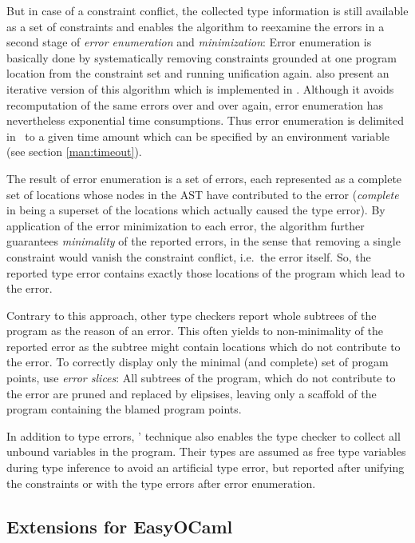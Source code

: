 But in case of a constraint conflict, the collected type information is still
available as a set of constraints and enables the algorithm to reexamine the
errors in a second stage of \emph{error enumeration} and \emph{minimization}:
Error enumeration is basically done by systematically removing constraints
grounded at one program location from the constraint set and running unification
again.
\citet{haackwells04} also present an iterative version of this algorithm which
is implemented in \easyocaml. Although it avoids recomputation of the same
errors over and over again, error enumeration has nevertheless exponential time
consumptions. Thus error enumeration is delimited in \easyocaml\ to a given time
amount which can be specified by an environment variable (see section
\ref{man:timeout}).

The result of error enumeration is a set of errors, each represented as a
complete set of locations whose nodes in the AST have contributed to the error
(\emph{complete} in being a superset of the locations which actually caused the type
error). By application of the error minimization to each error, the algorithm
further guarantees \emph{minimality} of the reported errors, in the sense that
removing a single constraint would vanish the constraint conflict, i.e.\ the
error itself.  So, the reported type error contains exactly those locations of
the program which lead to the error.

Contrary to this approach, other type checkers report whole subtrees of the
program as the reason of an error. This often yields to non-minimality of the
reported error as the subtree might contain locations which do not contribute
to the error. To correctly display only the minimal (and complete) set of
progam points, \citeauthor{haackwells04} use \emph{error slices}: All subtrees
of the program, which do not contribute to the error are pruned and replaced by
elipsises, leaving only a scaffold of the program containing the blamed program
points.

In addition to type errors, \citeauthor{haackwells04}' technique also enables the 
type checker to collect all unbound variables in the program.
Their types are assumed as free type variables during type inference to avoid
an artificial type error, but reported after unifying the constraints or with
the type errors after error enumeration.


\subsection{Extensions for EasyOCaml}
\label{sec:extending}


